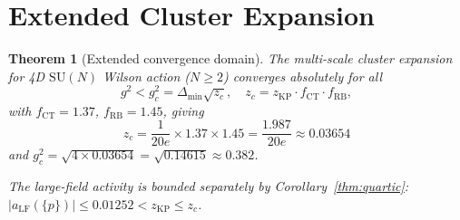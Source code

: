 \documentclass[11pt,a4paper]{amsart}
\newtheorem{theorem}{Theorem}[section]
\theoremstyle{definition}
\newcommand{\SU}{\mathrm{SU}}
\newcommand{\Del}{\Delta_{\min}}
\newcommand{\gB}{g^2_c}
\newcommand{\zKP}{z_{\mathrm{KP}}}
\begin{document}
\section{Extended Cluster Expansion}
\label{sec:extended}

\begin{theorem}[Extended convergence domain]
\label{thm:extended}
The multi-scale cluster expansion for 4D $\SU(N)$ Wilson action ($N\ge 2$) converges
absolutely for all
\[
  g^2 < \gB = \Del\sqrt{z_c},
  \quad
  z_c = \zKP\cdot f_{\mathrm{CT}}\cdot f_{\mathrm{RB}},
\]
with $f_{\mathrm{CT}} = 1.37$, $f_{\mathrm{RB}} = 1.45$,
giving
\[
  z_c = \frac{1}{20e}\times 1.37\times 1.45
       = \frac{1.987}{20e}
       \approx 0.03654
\]
and
$\gB = \sqrt{4\times 0.03654} = \sqrt{0.14615} \approx 0.382$.

The large-field activity is bounded separately by Corollary~\ref{thm:quartic}:
$|a_{\mathrm{LF}}(\{p\})| \le 0.01252 < \zKP \le z_c$.
\end{theorem}
\end{document}
